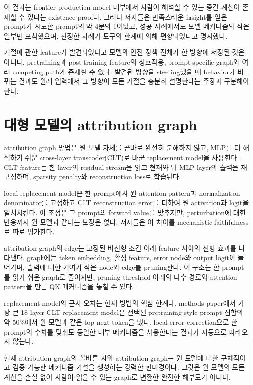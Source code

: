 이 결과는 frontier production model 내부에서 사람이 해석할 수 있는 중간 계산이 존재할 수 있다는 existence proof다.
그러나 저자들은 만족스러운 insight를 얻은 prompt가 시도한 prompt의 약 4분의 1이었고, 성공 사례에서도 모델 메커니즘의 작은 일부만 포착했으며, 선정한 사례가 도구의 한계에 의해 편향되었다고 명시했다.

거절에 관한 feature가 발견되었다고 모델의 안전 정책 전체가 한 방향에 저장된 것은 아니다.
pretraining과 post-training feature의 상호작용, prompt-specific graph와 여러 competing path가 존재할 수 있다.
발견된 방향을 steering했을 때 behavior가 바뀌는 결과도 원래 입력에서 그 방향이 모든 거절을 충분히 설명한다는 주장과 구분해야 한다.

\section{대형 모델의 attribution graph}

attribution graph 방법은 원 모델 자체를 곧바로 완전히 분해하지 않고, MLP를 더 해석하기 쉬운 cross-layer transcoder(CLT)로 바꾼 replacement model을 사용한다 \citep{ameisen2025circuittracing}.
CLT feature는 한 layer의 residual stream을 읽고 현재와 뒤 MLP layer의 출력을 재구성하며, sparsity penalty와 reconstruction loss로 학습된다.

local replacement model은 한 prompt에서 원 attention pattern과 normalization denominator를 고정하고 CLT reconstruction error를 더하여 원 activation과 logit을 일치시킨다.
이 조정은 그 prompt의 forward value를 맞추지만, perturbation에 대한 반응까지 원 모델과 같다는 보장은 없다.
저자들은 이 차이를 mechanistic faithfulness로 따로 평가한다.

attribution graph의 edge는 고정된 비선형 조건 아래 feature 사이의 선형 효과를 나타낸다.
graph에는 token embedding, 활성 feature, error node와 output logit이 들어가며, 출력에 대한 기여가 작은 node와 edge를 pruning한다.
이 구조는 한 prompt를 읽기 쉬운 graph로 줄이지만, pruning threshold 아래의 다수 경로와 attention pattern을 만든 QK 메커니즘을 놓칠 수 있다.

replacement model의 근사 오차는 현재 방법의 핵심 한계다.
methods paper에서 가장 큰 18-layer CLT replacement model은 선택된 pretraining-style prompt 집합의 약 50\%에서 원 모델과 같은 top next token을 냈다.
local error correction으로 한 prompt의 수치를 맞춰도 동일한 내부 메커니즘을 사용한다는 결과가 자동으로 따라오지 않는다.

\begin{interpretbox}{현재 attribution graph의 올바른 지위}
attribution graph는 원 모델에 대한 구체적이고 검증 가능한 메커니즘 가설을 생성하는 강력한 현미경이다.
그것은 원 모델의 모든 계산을 손실 없이 사람이 읽을 수 있는 graph로 변환한 완전한 해부도가 아니다.
\end{interpretbox}

